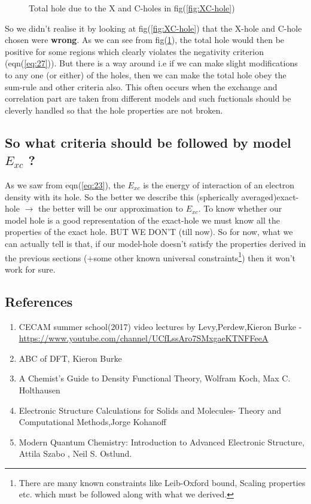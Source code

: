\documentclass{article}
\begin{document}
\begin{Large}
\begin{flushleft}
\begin{figure}[h]
  \caption{Total hole due to the X and C-holes in fig(\ref{fig:XC-hole})}
  \label{fig:total-hole}
  \end{figure}
  So we didn't realise it by looking at fig(\ref{fig:XC-hole}) that the X-hole and C-hole chosen were \textbf{wrong}. As we can see from fig(\ref{fig:total-hole}), the total hole would then be positive for some regions which clearly violates the negativity criterion (eqn(\ref{eq:27})). But there is a way around i.e if we can make slight modifications to any one (or either) of the holes, then we can make the total hole obey the sum-rule and other criteria also. This often occurs when the exchange and correlation part are taken from different models and such fuctionals should be cleverly handled so that the hole properties are not broken.
  
 \subsection*{\Large{So what criteria should be followed by model $E_{xc}$ ?}}
  As we saw from eqn(\ref{eq:23}), the $E_{xc}$ is the energy of interaction of an electron density with its hole. So the better we describe this (spherically averaged)exact-hole $\rightarrow$ the better will be our approximation to $E_{xc}$. To know whether our model hole is a good representation of the exact-hole we must know all the properties of the exact hole. BUT WE DON'T (till now). So for now, what we can actually tell is that, if our model-hole doesn't satisfy the properties derived in the previous sections (+some other known universal constraints\footnote{There are many known constraints like Leib-Oxford bound, Scaling properties etc. which must be followed along with what we derived.}) then it won't work for sure. 
  
 \subsection*{\Large{References}}
  \begin{enumerate}
	 \item{CECAM summer school(2017) video lectures by Levy,Perdew,Kieron Burke - \\ \underline{\url{https://www.youtube.com/channel/UCfLssAro7SMxgaeKTNFFeeA}}}
	 \item{ABC of DFT, Kieron Burke}
	 \item{A Chemist’s Guide to
Density Functional Theory, Wolfram Koch, Max C. Holthausen}
	 \item{Electronic Structure Calculations for Solids and Molecules- Theory and Computational Methods,Jorge Kohanoff}
	 \item{Modern Quantum Chemistry: Introduction to Advanced Electronic Structure, Attila Szabo , Neil S. Ostlund. }
	 \end{enumerate}
   \end{flushleft}
  \end{Large}    
  
\end{document}
